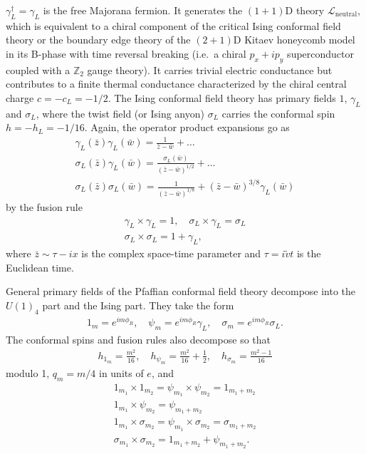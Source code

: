 $\gamma_L^\dagger=\gamma_L$ is the free Majorana fermion. It generates the $(1+1)$D theory $\mathcal{L}_{\mathrm{neutral}}$, which is equivalent to a chiral component of the critical Ising conformal field theory or the boundary edge theory of the $(2+1)$D Kitaev honeycomb model~\cite{Kitaev06} in its B-phase with time reversal breaking (i.e.~a chiral $p_x+ip_y$ superconductor coupled with a $\mathbb{Z}_2$ gauge theory). It carries trivial electric conductance but contributes to a finite thermal conductance characterized by the chiral central charge $c=-c_L=-1/2$. The Ising conformal field theory has primary fields $1$, $\gamma_L$ and $\sigma_L$, where the twist field (or Ising anyon) $\sigma_L$ carries the conformal spin $h=-h_L=-1/16$. Again, the operator product expansions go as \begin{gather}\gamma_L(\bar{z})\gamma_L(\bar{w})=\frac{1}{\bar{z}-\bar{w}}+\ldots\nonumber\\\sigma_L(\bar{z})\gamma_L(\bar{w})=\frac{\sigma_L(\bar{w})}{(\bar{z}-\bar{w})^{1/2}}+\ldots\nonumber\\\sigma_L(\bar{z})\sigma_L(\bar{w})=\frac{1}{(\bar{z}-\bar{w})^{1/8}}+(\bar{z}-\bar{w})^{3/8}\gamma_L(\bar{w})\nonumber\end{gather} by the fusion rule \begin{gather}\gamma_L\times\gamma_L=1,\quad\sigma_L\times\gamma_L=\sigma_L\nonumber\\\sigma_L\times\sigma_L=1+\gamma_L,\end{gather} where $\bar{z}\sim\tau-ix$ is the complex space-time parameter and $\tau=i\tilde{v}t$ is the Euclidean time. 

General primary fields of the Pfaffian conformal field theory decompose into the $U(1)_4$ part and the Ising part. They take the form \begin{align}1_m=e^{im\phi_R},\quad\psi_m=e^{im\phi_R}\gamma_L,\quad\sigma_m=e^{im\phi_R}\sigma_L.\label{Pfaffianfields}\end{align} The conformal spins and fusion rules also decompose so that \begin{align}h_{1_m}=\frac{m^2}{16},\quad h_{\psi_m}=\frac{m^2}{16}+\frac{1}{2},\quad h_{\sigma_m}=\frac{m^2-1}{16}\end{align} modulo 1, $q_m=m/4$ in units of $e$, and \begin{gather}1_{m_1}\times1_{m_2}=\psi_{m_1}\times\psi_{m_2}=1_{m_1+m_2}\nonumber\\1_{m_1}\times\psi_{m_2}=\psi_{m_1+m_2}\nonumber\\1_{m_1}\times\sigma_{m_2}=\psi_{m_1}\times\sigma_{m_2}=\sigma_{m_1+m_2}\nonumber\\\sigma_{m_1}\times\sigma_{m_2}=1_{m_1+m_2}+\psi_{m_1+m_2}.\end{gather} 

